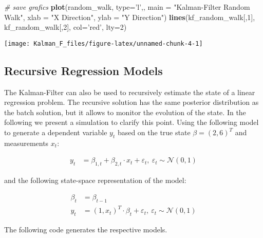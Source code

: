 \documentclass[
]{article}
\newenvironment{Shaded}{\begin{snugshade}}{\end{snugshade}}
\newcommand{\CommentTok}[1]{\textcolor[rgb]{0.56,0.35,0.01}{\textit{#1}}}
\newcommand{\DataTypeTok}[1]{\textcolor[rgb]{0.13,0.29,0.53}{#1}}
\newcommand{\DecValTok}[1]{\textcolor[rgb]{0.00,0.00,0.81}{#1}}
\newcommand{\KeywordTok}[1]{\textcolor[rgb]{0.13,0.29,0.53}{\textbf{#1}}}
\newcommand{\NormalTok}[1]{#1}
\newcommand{\StringTok}[1]{\textcolor[rgb]{0.31,0.60,0.02}{#1}}
\begin{document}
\begin{Shaded}
\begin{Highlighting}[]
\CommentTok{# save grafics}
\KeywordTok{plot}\NormalTok{(random_walk, }\DataTypeTok{type=}\StringTok{'l'}\NormalTok{,, }
    \DataTypeTok{main =} \StringTok{"Kalman-Filter Random Walk"}\NormalTok{,}
    \DataTypeTok{xlab =} \StringTok{"X Direction"}\NormalTok{,}
    \DataTypeTok{ylab =} \StringTok{"Y Direction"}\NormalTok{)}
\KeywordTok{lines}\NormalTok{(kf_random_walk[,}\DecValTok{1}\NormalTok{], kf_random_walk[,}\DecValTok{2}\NormalTok{], }\DataTypeTok{col=}\StringTok{'red'}\NormalTok{, }\DataTypeTok{lty=}\DecValTok{2}\NormalTok{)}
\end{Highlighting}
\end{Shaded}

\begin{center}\texttt{[image: Kalman\_F\_files/figure-latex/unnamed-chunk-4-1]} \end{center}

\hypertarget{recursive-regression-models}{%
\subsection{Recursive Regression
Models}\label{recursive-regression-models}}

The Kalman-Filter can also be used to recursively estimate the state of
a linear regression problem. The recursive solution has the same
posterior distribution as the batch solution, but it allows to monitor
the evolution of the state. In the following we present a simulation to
clarify this point. Using the following model to generate a dependent
variable \(y_t\) based on the true state \(\beta = (2,6)^T\) and
measurements \(x_t\):

\[
\begin{align*} 
    y_t &= \beta_{1,t} + \beta_{2,t}\cdot x_t + \varepsilon_t, \ \varepsilon_t \sim \mathcal{N}(0,1)
\end{align*}
\]

and the following state-space representation of the model:

\[
\begin{align*}
    \beta_t &= \beta_{t-1} \\
    y_t &= (1, x_t)^T \cdot \beta_t + \varepsilon_t, \ \varepsilon_t \sim \mathcal{N}(0,1)
\end{align*}
\]

The following code generates the respective models.
\end{document}

